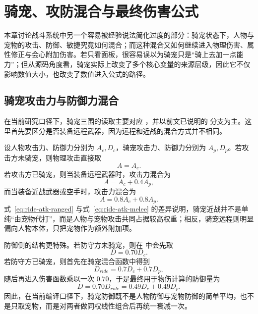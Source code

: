 \chapter{骑宠、攻防混合与最终伤害公式}

本章讨论战斗系统中另一个容易被经验说法简化过度的部分：骑宠状态下，人物与宠物的攻击、防御、敏捷究竟如何混合；而这种混合又如何继续进入物理伤害、属性修正与会心附加伤害。若只看面板，很容易误以为骑宠只是“骑上去加一点能力”；但从源码角度看，骑宠实际上改变了多个核心变量的来源层级，因此它不仅影响数值大小，也改变了数值进入公式的路径。

\section{骑宠攻击力与防御力混合}

在当前研究口径下，骑宠三围的读取主要对应 ，并以前文已说明的  分支为主。这里首先要区分是否装备远程武器，因为远程和近战的混合方式并不相同。

设人物攻击力、防御力分别为 $A_c,D_c$，骑宠攻击力、防御力分别为 $A_p,D_p$。若攻击方未骑宠，则物理攻击直接取
\begin{equation}
    A = A_c.
\end{equation}
若攻击方已骑宠，则当装备远程武器时，攻击力混合为
\begin{equation}
    A = A_c + 0.4A_p,
    \label{eq:ride-atk-ranged}
\end{equation}
而当装备近战武器或空手时，攻击力混合为
\begin{equation}
    A = 0.8A_c + 0.8A_p.
    \label{eq:ride-atk-melee}
\end{equation}
式~\eqref{eq:ride-atk-ranged} 与式~\eqref{eq:ride-atk-melee} 的差异说明，骑宠近战并不是单纯“由宠物代打”，而是人物与宠物攻击共同占据较高权重；相反，骑宠远程则明显偏向人物本体，只把宠物作为额外附加项。

防御侧的结构更特殊。若防守方未骑宠，则在  中会先取
\begin{equation}
    D = 0.70D_c.
    \label{eq:def-no-ride}
\end{equation}
若防守方已骑宠，则首先在骑宠混合函数中得到
\begin{equation}
    D_{ride}=0.7D_c+0.7D_p,
\end{equation}
随后再进入伤害函数乘以一次 $0.70$，于是最终用于物伤计算的防御量为
\begin{equation}
    D = 0.70D_{ride}=0.49D_c+0.49D_p.
    \label{eq:def-ride}
\end{equation}
因此，在当前编译口径下，骑宠防御既不是人物防御与宠物防御的简单平均，也不是只取宠物，而是对两者做同权线性组合后再统一衰减一次。

